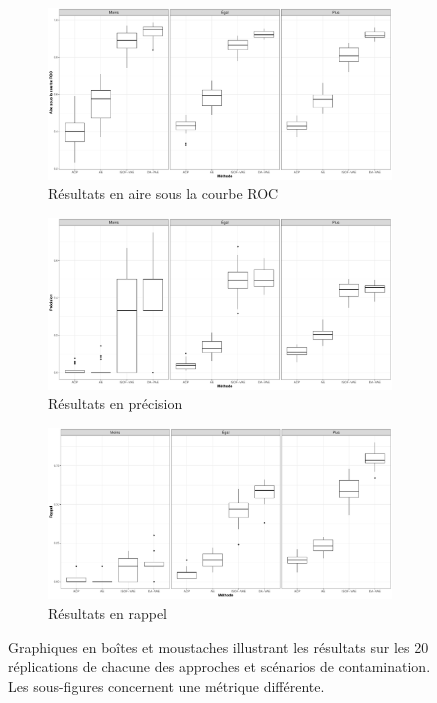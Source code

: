 \DIFdelbegin %
\DIFdelendFL \DIFaddbeginFL \begin{figure}[h!]
	\DIFaddendFL \centering
	\begin{subfigure}{12cm}
		\includegraphics[width=12cm]{images/images_boxplots/auc_cars.pdf}
		\caption{Résultats en aire sous la courbe ROC}
	\end{subfigure}
	\begin{subfigure}{12cm}
		\includegraphics[width=12cm]{images/images_boxplots/precision_cars.pdf}
		\caption{Résultats en précision}
	\end{subfigure}
	\begin{subfigure}{12cm}
		\includegraphics[width=12cm]{images/images_boxplots/recall_cars.pdf}
		\caption{Résultats en rappel}
	\end{subfigure}
	\caption{Graphiques en boîtes et moustaches illustrant les résultats sur les 20 réplications de chacune des approches et scénarios de contamination. Les \DIFdelbeginFL {}\DIFdelendFL \DIFaddbeginFL {}\DIFaddendFL sous-figures concernent une métrique différente.}
	\label{fig:auc_cars}
\end{figure}

